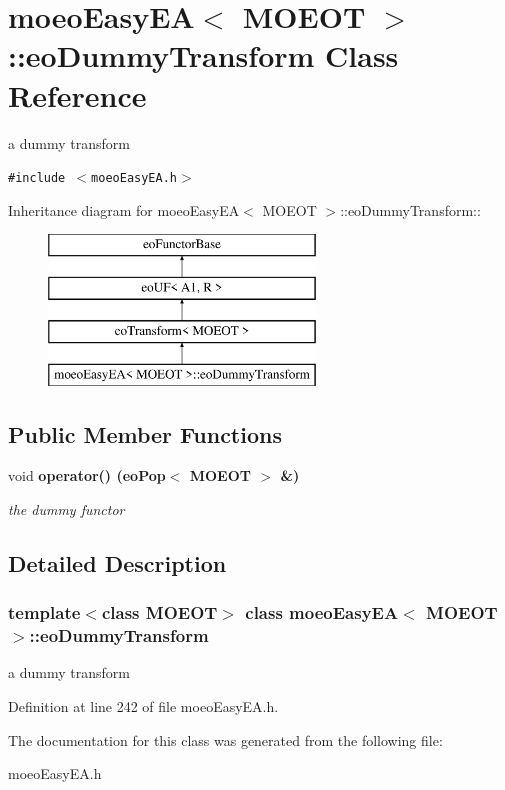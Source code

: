 \section{moeo\-Easy\-EA$<$ MOEOT $>$::eo\-Dummy\-Transform Class Reference}
\label{classmoeoEasyEA_1_1eoDummyTransform}
a dummy transform  


{\tt \#include $<$moeo\-Easy\-EA.h$>$}

Inheritance diagram for moeo\-Easy\-EA$<$ MOEOT $>$::eo\-Dummy\-Transform::\begin{figure}[H]
\begin{center}
\leavevmode
\includegraphics[height=4cm]{classmoeoEasyEA_1_1eoDummyTransform}
\end{center}
\end{figure}
\subsection*{Public Member Functions}
\begin{CompactItemize}
\item 
void \bf{operator()} (\bf{eo\-Pop}$<$ MOEOT $>$ \&)\label{classmoeoEasyEA_1_1eoDummyTransform_0e153e482291a7f19f7f7a02505fb432}

\begin{CompactList}\small\item\em the dummy functor \item\end{CompactList}\end{CompactItemize}


\subsection{Detailed Description}
\subsubsection*{template$<$class MOEOT$>$ class moeo\-Easy\-EA$<$ MOEOT $>$::eo\-Dummy\-Transform}

a dummy transform 



Definition at line 242 of file moeo\-Easy\-EA.h.

The documentation for this class was generated from the following file:\begin{CompactItemize}
\item 
moeo\-Easy\-EA.h\end{CompactItemize}

